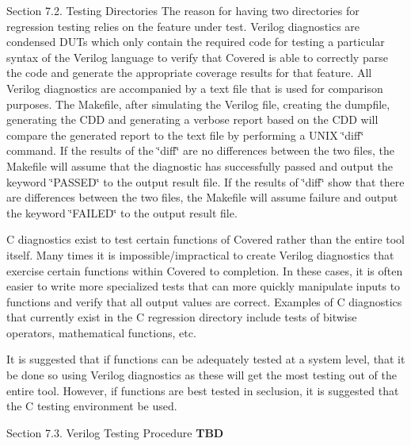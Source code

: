 \begin{Desc}
\item[Section 7.2. Testing Directories]The reason for having two directories for regression testing relies on the feature under test. Verilog diagnostics are condensed DUTs which only contain the required code for testing a particular syntax of the Verilog language to verify that Covered is able to correctly parse the code and generate the appropriate coverage results for that feature. All Verilog diagnostics are accompanied by a text file that is used for comparison purposes. The Makefile, after simulating the Verilog file, creating the dumpfile, generating the CDD and generating a verbose report based on the CDD will compare the generated report to the text file by performing a UNIX \char`\"{}diff\char`\"{} command. If the results of the \char`\"{}diff\char`\"{} are no differences between the two files, the Makefile will assume that the diagnostic has successfully passed and output the keyword \char`\"{}PASSED\char`\"{} to the output result file. If the results of \char`\"{}diff\char`\"{} show that there are differences between the two files, the Makefile will assume failure and output the keyword \char`\"{}FAILED\char`\"{} to the output result file.\end{Desc}
\begin{Desc}
\item[]C diagnostics exist to test certain functions of Covered rather than the entire tool itself. Many times it is impossible/impractical to create Verilog diagnostics that exercise certain functions within Covered to completion. In these cases, it is often easier to write more specialized tests that can more quickly manipulate inputs to functions and verify that all output values are correct. Examples of C diagnostics that currently exist in the C regression directory include tests of bitwise operators, mathematical functions, etc.\end{Desc}
\begin{Desc}
\item[]It is suggested that if functions can be adequately tested at a system level, that it be done so using Verilog diagnostics as these will get the most testing out of the entire tool. However, if functions are best tested in seclusion, it is suggested that the C testing environment be used.\end{Desc}




\begin{Desc}
\item[Section 7.3. Verilog Testing Procedure]{\bf TBD}  \end{Desc}




